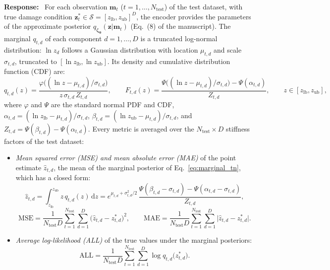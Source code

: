 \documentclass[11pt]{article}
\newenvironment{response}{\par\smallskip\noindent\color{resp}\textbf{Response:}\ }{\par}
\newcommand{\m}{\mathbf{m}}
\newcommand{\z}{\mathbf{z}}
\begin{document}
\begin{response}
For each observation $\m_t$ ($t=1,\dots,N_{\text{test}}$) of the test dataset, with true damage condition
$\z^*_t\in\mathcal{S}=[z_{\text{lb}},z_{\text{ub}}]^{D}$, the encoder provides the parameters of the approximate posterior
$q_{\bm\zeta_{\bm\theta}}(\z|\m_t)$ (Eq.~(8) of the manuscript). The marginal $q_{t,d}$ of each component $d=1,\dots,D$ is
a truncated log-normal distribution: $\ln z_d$ follows a Gaussian distribution with location $\mu_{t,d}$ and scale
$\sigma_{t,d}$, truncated to $[\ln z_{\text{lb}},\ln z_{\text{ub}}]$. Its density and cumulative distribution function
(CDF) are:
\begin{equation}
	q_{t,d}(z)=\frac{\varphi\big((\ln z-\mu_{t,d})/\sigma_{t,d}\big)}{z\,\sigma_{t,d}\,Z_{t,d}},\qquad
	F_{t,d}(z)=\frac{\Psi\big((\ln z-\mu_{t,d})/\sigma_{t,d}\big)-\Psi(\alpha_{t,d})}{Z_{t,d}},\qquad
	z\in[z_{\text{lb}},z_{\text{ub}}],
	\label{eq:marginal_tn}
\end{equation}
where $\varphi$ and $\Psi$ are the standard normal PDF and CDF, $\alpha_{t,d}=(\ln z_{\text{lb}}-\mu_{t,d})/\sigma_{t,d}$,
$\beta_{t,d}=(\ln z_{\text{ub}}-\mu_{t,d})/\sigma_{t,d}$, and $Z_{t,d}=\Psi(\beta_{t,d})-\Psi(\alpha_{t,d})$. Every metric is
averaged over the $N_{\text{test}}\times D$ stiffness factors of the test dataset:
\begin{itemize}[leftmargin=*]
	\item \emph{Mean squared error (MSE) and mean absolute error (MAE)} of the point estimate $\hat z_{t,d}$, the mean of
	the marginal posterior of Eq.~\eqref{eq:marginal_tn}, which has a closed form:
	\begin{equation*}
		\hat z_{t,d}=\int_{z_{\text{lb}}}^{z_{\text{ub}}} z\,q_{t,d}(z)\,\mathrm{d}z
		=e^{\mu_{t,d}+\sigma_{t,d}^2/2}\,\frac{\Psi(\beta_{t,d}-\sigma_{t,d})-\Psi(\alpha_{t,d}-\sigma_{t,d})}{Z_{t,d}},
	\end{equation*}
	\begin{equation}
		\mathrm{MSE}=\frac{1}{N_{\text{test}}D}\sum_{t=1}^{N_{\text{test}}}\sum_{d=1}^{D}\big(\hat z_{t,d}-z^*_{t,d}\big)^2,\qquad
		\mathrm{MAE}=\frac{1}{N_{\text{test}}D}\sum_{t=1}^{N_{\text{test}}}\sum_{d=1}^{D}\big|\hat z_{t,d}-z^*_{t,d}\big|.
		\label{eq:mse_mae}
	\end{equation}
	\item \emph{Average log-likelihood (ALL)} of the true values under the marginal posteriors:
	\begin{equation}
		\mathrm{ALL}=\frac{1}{N_{\text{test}}D}\sum_{t=1}^{N_{\text{test}}}\sum_{d=1}^{D}\log q_{t,d}\big(z^*_{t,d}\big).

\end{equation}
\end{itemize}
\end{response}
\end{document}
